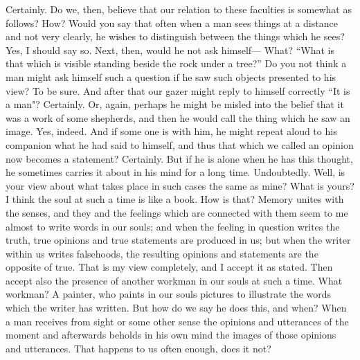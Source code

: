 \documentclass[letterpaper,12pt]{article}
\newcommand{\stephpag}[1]{\marginnote{\small\itshape\fontfamily{ppl}\selectfont #1}}
\begin{document}
\begin{drama}
\protarchusspeaks
Certainly.
\socratesspeaks
Do we, then, believe that our relation to these faculties is somewhat as follows?
\protarchusspeaks
How?
\socratesspeaks
Would you say that often when a man sees things at a distance and not very clearly, he wishes to distinguish between the things which he sees?
\protarchusspeaks
Yes, I should say so.
\socratesspeaks
Next, then, would he not ask himself---
\protarchusspeaks
What?
\socratesspeaks
``What is that which is visible standing \stephpag{d} beside the rock under a tree?'' Do you not think a man might ask himself such a question if he saw such objects presented to his view?
\protarchusspeaks
To be sure.
\socratesspeaks
And after that our gazer might reply to himself correctly ``It is a man"?
\protarchusspeaks
Certainly.
\socratesspeaks
Or, again, perhaps he might be misled into the belief that it was a work of some shepherds, and then he would call the thing which he saw an image.
\protarchusspeaks
Yes, indeed. \stephpag{e}
\socratesspeaks
And if some one is with him, he might repeat aloud to his companion what he had said to himself, and thus that which we called an opinion now becomes a statement?
\protarchusspeaks
Certainly.
\socratesspeaks
But if he is alone when he has this thought, he sometimes carries it about in his mind for a long time.
\protarchusspeaks
Undoubtedly.
\socratesspeaks
Well, is your view about what takes place in such cases the same as mine?
\protarchusspeaks
What is yours?
\socratesspeaks
I think the soul at such a time is like a book.
\protarchusspeaks
How is that? \stephpag{39 a}
\socratesspeaks
Memory unites with the senses, and they and the feelings which are connected with them seem to me almost to write words in our souls; and when the feeling in question writes the truth, true opinions and true statements are produced in us; but when the writer within us writes falsehoods, the resulting opinions and statements are the opposite of true. \stephpag{b}
\protarchusspeaks
That is my view completely, and I accept it as stated.
\socratesspeaks
Then accept also the presence of another workman in our souls at such a time.
\protarchusspeaks
What workman?
\socratesspeaks
A painter, who paints in our souls pictures to illustrate the words which the writer has written.
\protarchusspeaks
But how do we say he does this, and when?
\socratesspeaks
When a man receives from sight or some other sense the opinions and utterances of the moment and afterwards beholds in his own mind the images of those opinions and utterances. \stephpag{c} That happens to us often enough, does it not?
\protarchusspeaks

\end{drama}
\end{document}
